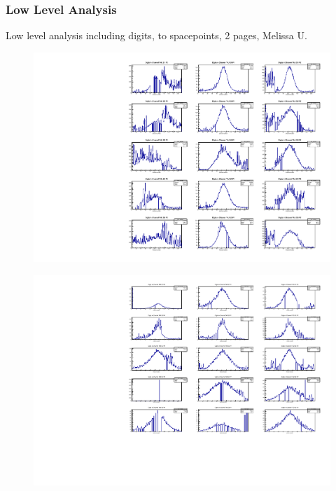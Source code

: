 \subsubsection{Low Level Analysis}
Low level analysis including digits, to spacepoints, 2 pages, Melissa U.
\begin{figure}[ht]
\begin{center}
\includegraphics[width=\textwidth,keepaspectratio=true,]{Digits_Up.pdf}
\end{center}
\caption{}
\label{Figure:Digits_Up}
\end{figure}

\begin{figure}[ht]
\begin{center}
\includegraphics[width=\textwidth,keepaspectratio=true,]{Digits_Down.pdf}
\end{center}
\caption{}
\label{Figure:Digits_Down}
\end{figure}


